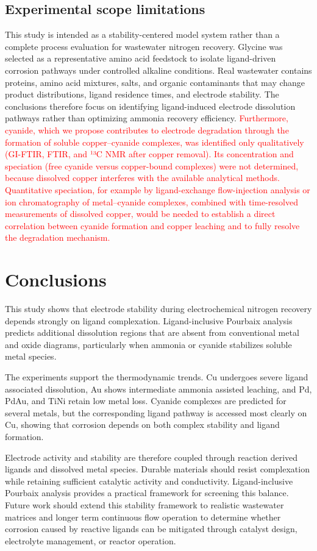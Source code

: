 \documentclass[twoside,twocolumn,9pt]{article}
\begin{document}
\subsection{Experimental scope limitations}
This study is intended as a stability-centered model system rather than a complete process evaluation for wastewater nitrogen recovery. Glycine was selected as a representative amino acid feedstock to isolate ligand-driven corrosion pathways under controlled alkaline conditions. Real wastewater contains proteins, amino acid mixtures, salts, and organic contaminants that may change product distributions, ligand residence times, and electrode stability. The conclusions therefore focus on identifying ligand-induced electrode dissolution pathways rather than optimizing ammonia recovery efficiency. \textcolor{red}{ Furthermore, cyanide, which we propose contributes to electrode degradation through the formation of soluble copper–cyanide complexes, was identified only qualitatively (GI-FTIR, FTIR, and ¹³C NMR after copper removal). Its concentration and speciation (free cyanide versus copper-bound complexes) were not determined, because dissolved copper interferes with the available analytical methods. Quantitative speciation, for example by ligand-exchange flow-injection analysis or ion chromatography of metal–cyanide complexes, combined with time-resolved measurements of dissolved copper, would be needed to establish a direct correlation between cyanide formation and copper leaching and to fully resolve the degradation mechanism.}

\section*{Conclusions}
This study shows that electrode stability during electrochemical nitrogen recovery depends strongly on ligand complexation. Ligand-inclusive Pourbaix analysis predicts additional dissolution regions that are absent from conventional metal and oxide diagrams, particularly when ammonia or cyanide stabilizes soluble metal species.

The experiments support the thermodynamic trends. Cu undergoes severe ligand associated dissolution, Au shows intermediate ammonia assisted leaching, and Pd, PdAu, and TiNi retain low metal loss. Cyanide complexes are predicted for several metals, but the corresponding ligand pathway is accessed most clearly on Cu, showing that corrosion depends on both complex stability and ligand formation.

Electrode activity and stability are therefore coupled through reaction derived ligands and dissolved metal species. Durable materials should resist complexation while retaining sufficient catalytic activity and conductivity. Ligand-inclusive Pourbaix analysis provides a practical framework for screening this balance. Future work should extend this stability framework to realistic wastewater matrices and longer term continuous flow operation to determine whether corrosion caused by reactive ligands can be mitigated through catalyst design, electrolyte management, or reactor operation.
\end{document}
